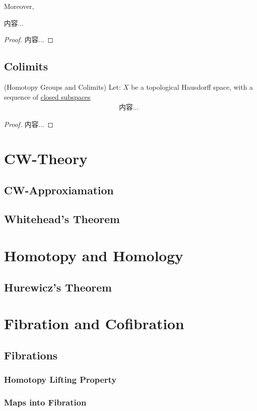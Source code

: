 \documentclass[Total.tex]{subfiles}
\begin{document}
			Moreover, 
			\begin{corollary}
				内容...
			\end{corollary}
			\begin{proof}
				内容...
			\end{proof}
			
		\section{Colimits}
			\begin{theorem}
				(Homotopy Groups and Colimits) Let: $X$ be a topological Hausdorff space, with a sequence of \underline{closed subspaces}
				\begin{gather*}
					内容...
				\end{gather*}
			\end{theorem}
			\begin{proof}
				内容...
			\end{proof}
	\chapter{CW-Theory}
		
		\section{CW-Approxiamation}
		\section{Whitehead's Theorem}
	\chapter{Homotopy and Homology}
		\section{Hurewicz's Theorem}
	\chapter{Fibration and Cofibration}
		\section{Fibrations}
			\subsection{Homotopy Lifting Property}
			\subsection{Maps into Fibration}
			
\end{document}
